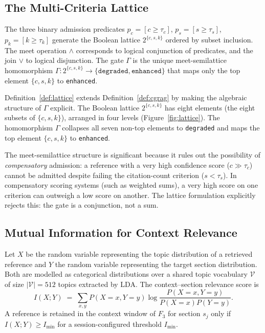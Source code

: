 

\subsection{The Multi-Criteria Lattice}

\begin{definition}
\label{def:lattice}
The three binary admission predicates
$p_c = [c\geq\tau_c]$, $p_s = [s\geq\tau_s]$, $p_k = [k\geq\tau_k]$
generate the Boolean lattice $2^{\{c,s,k\}}$ ordered by subset inclusion.
The meet operation $\wedge$ corresponds to logical conjunction of predicates,
and the join $\vee$ to logical disjunction.
The gate $\Gamma$ is the unique meet-semilattice homomorphism
$\Gamma: 2^{\{c,s,k\}} \to \{\texttt{degraded},\texttt{enhanced}\}$
that maps only the top element $\{c,s,k\}$ to \texttt{enhanced}.
\end{definition}

Definition~\ref{def:lattice} extends Definition~\ref{def:cgrag} by making the
algebraic structure of $\Gamma$ explicit.
The Boolean lattice $2^{\{c,s,k\}}$ has eight elements (the eight subsets of
$\{c,s,k\}$), arranged in four levels (Figure~\ref{fig:lattice}).
The homomorphism $\Gamma$ collapses all seven non-top elements to \texttt{degraded}
and maps the top element $\{c,s,k\}$ to \texttt{enhanced}.

The meet-semilattice structure is significant because it rules out the possibility of
\emph{compensatory} admission: a reference with a very high confidence score ($c\gg\tau_c$)
cannot be admitted despite failing the citation-count criterion ($s<\tau_s$).
In compensatory scoring systems (such as weighted sums), a very high score on one criterion
can outweigh a low score on another.
The lattice formulation explicitly rejects this: the gate is a conjunction, not a sum.

\subsection{Mutual Information for Context Relevance}

\begin{definition}
\label{def:mutual_info}
Let $X$ be the random variable representing the topic distribution of a retrieved
reference and $Y$ the random variable representing the target section distribution.
Both are modelled as categorical distributions over a shared topic vocabulary
$\mathcal{V}$ of size $|\mathcal{V}|=512$ topics extracted by LDA.
The context--section relevance score is
\[
  I(X;Y) \;=\; \sum_{x,y} P(X=x,Y=y)\log\frac{P(X=x,Y=y)}{P(X=x)P(Y=y)}.
\]
A reference is retained in the context window of $F_3$ for section $s_j$ only if
$I(X;Y)\geq I_{\min}$ for a session-configured threshold $I_{\min}$.
\end{definition}

